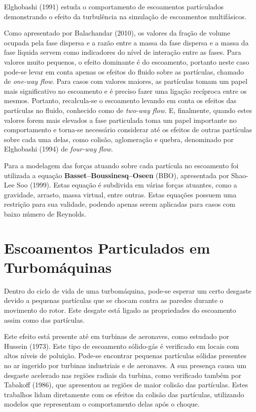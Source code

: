 Elghobashi (1991)\cite{Elghobashi-1991} estuda o comportamento de escoamentos partículados demonstrando o efeito da turbulência na simulação de escoamentos multifásicos.

Como apresentado por Balachandar (2010)\cite{Balachandar-2010}, os valores da fração de volume ocupada pela fase dispersa e a razão entre a massa da fase dispersa e a massa da fase líquida servem como indicadores do nível de interação entre as fases.
Para valores muito pequenos, o efeito dominante é do escoamento, portanto neste caso pode-se levar em conta apenas os efeitos do fluido sobre as partículas, chamado de \textit{one-way flow}.
Para casos com valores maiores, as partículas tomam um papel mais significativo no escoamento e é preciso fazer uma ligação recíproca entre os mesmos.
Portanto, recalcula-se o escoamento levando em conta os efeitos das partículas no fluido, conhecido como de \textit{two-way flow}.
E, finalmente, quando estes valores forem mais elevados a fase particulada toma um papel importante no comportamento e torna-se necessário considerar até os efeitos de outras partículas sobre cada uma delas, como colisão, aglomeração e quebra, denominado por Elghobashi (1994)\cite{Elghobashi-1994} de \textit{four-way flow}.

Para a modelagem das forças atuando sobre cada partícula no escoamento foi utilizada a equação \textbf{Basset–Boussinesq–Oseen} (BBO), apresentada por Shao-Lee Soo (1999)\cite{ShaoLeeSoo-1999}.
Estas equação é subdivida em várias forças atuantes, como a gravidade, arrasto, massa virtual, entre outras.
Estas equações possuem uma restrição para sua validade, podendo apenas serem aplicadas para casos com baixo número de Reynolds.


\section{\textbf{Escoamentos Particulados em Turbomáquinas}}
Dentro do ciclo de vida de uma turbomáquina, pode-se esperar um certo desgaste devido a pequenas partículas que se chocam contra as paredes durante o movimento do rotor.
Este desgate está ligado as propriedades do escoamento assim como das partículas.

Este efeito está presente até em turbinas de aeronaves, como estudado por Hussein (1973)\cite{Hussein-1973}.
Este tipo de escoamento sólido-gás é verificado em locais com altos níveis de poluição.
Pode-se encontrar pequenas partículas sólidas presentes no ar ingerido por turbinas industriais e de aeronaves.
A sua presença causa um desgaste acelerado nas regiões radiais da turbina, como verificado também por Tabakoff (1986)\cite{Tabakoff-1986}, que apresentou as regiões de maior colisão das partículas.
Estes trabalhos lidam diretamente com os efeitos da colisão das partículas, utilizando modelos que representam o comportamento delas após o choque.

